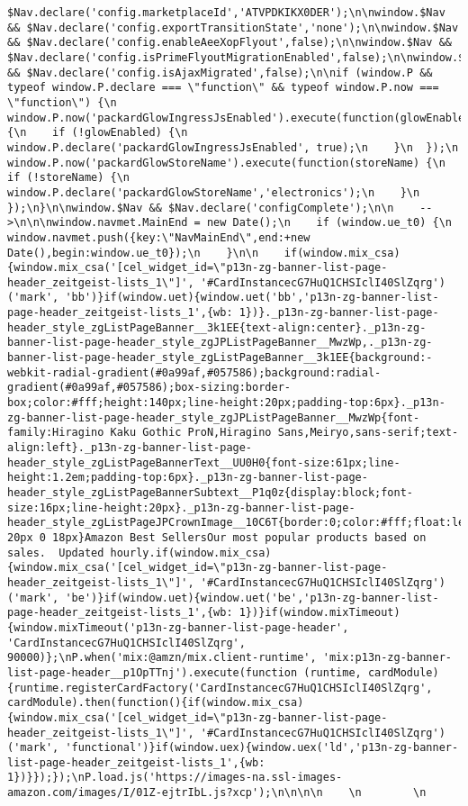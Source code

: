 \documentclass[
]{article}
\begin{document}
\begin{verbatim}
$Nav.declare('config.marketplaceId','ATVPDKIKX0DER');\n\nwindow.$Nav && $Nav.declare('config.exportTransitionState','none');\n\nwindow.$Nav && $Nav.declare('config.enableAeeXopFlyout',false);\n\nwindow.$Nav && $Nav.declare('config.isPrimeFlyoutMigrationEnabled',false);\n\nwindow.$Nav && $Nav.declare('config.isAjaxMigrated',false);\n\nif (window.P && typeof window.P.declare === \"function\" && typeof window.P.now === \"function\") {\n  window.P.now('packardGlowIngressJsEnabled').execute(function(glowEnabled) {\n    if (!glowEnabled) {\n      window.P.declare('packardGlowIngressJsEnabled', true);\n    }\n  });\n  window.P.now('packardGlowStoreName').execute(function(storeName) {\n    if (!storeName) {\n      window.P.declare('packardGlowStoreName','electronics');\n    }\n  });\n}\n\nwindow.$Nav && $Nav.declare('configComplete');\n\n    -->\n\n\nwindow.navmet.MainEnd = new Date();\n    if (window.ue_t0) {\n      window.navmet.push({key:\"NavMainEnd\",end:+new Date(),begin:window.ue_t0});\n    }\n\n    if(window.mix_csa){window.mix_csa('[cel_widget_id=\"p13n-zg-banner-list-page-header_zeitgeist-lists_1\"]', '#CardInstancecG7HuQ1CHSIclI40SlZqrg')('mark', 'bb')}if(window.uet){window.uet('bb','p13n-zg-banner-list-page-header_zeitgeist-lists_1',{wb: 1})}._p13n-zg-banner-list-page-header_style_zgListPageBanner__3k1EE{text-align:center}._p13n-zg-banner-list-page-header_style_zgJPListPageBanner__MwzWp,._p13n-zg-banner-list-page-header_style_zgListPageBanner__3k1EE{background:-webkit-radial-gradient(#0a99af,#057586);background:radial-gradient(#0a99af,#057586);box-sizing:border-box;color:#fff;height:140px;line-height:20px;padding-top:6px}._p13n-zg-banner-list-page-header_style_zgJPListPageBanner__MwzWp{font-family:Hiragino Kaku Gothic ProN,Hiragino Sans,Meiryo,sans-serif;text-align:left}._p13n-zg-banner-list-page-header_style_zgListPageBannerText__UU0H0{font-size:61px;line-height:1.2em;padding-top:6px}._p13n-zg-banner-list-page-header_style_zgListPageBannerSubtext__P1q0z{display:block;font-size:16px;line-height:20px}._p13n-zg-banner-list-page-header_style_zgListPageJPCrownImage__10C6T{border:0;color:#fff;float:left;height:80px;margin:20px 20px 0 18px}Amazon Best SellersOur most popular products based on sales.  Updated hourly.if(window.mix_csa){window.mix_csa('[cel_widget_id=\"p13n-zg-banner-list-page-header_zeitgeist-lists_1\"]', '#CardInstancecG7HuQ1CHSIclI40SlZqrg')('mark', 'be')}if(window.uet){window.uet('be','p13n-zg-banner-list-page-header_zeitgeist-lists_1',{wb: 1})}if(window.mixTimeout){window.mixTimeout('p13n-zg-banner-list-page-header', 'CardInstancecG7HuQ1CHSIclI40SlZqrg', 90000)};\nP.when('mix:@amzn/mix.client-runtime', 'mix:p13n-zg-banner-list-page-header__p1OpTTnj').execute(function (runtime, cardModule) {runtime.registerCardFactory('CardInstancecG7HuQ1CHSIclI40SlZqrg', cardModule).then(function(){if(window.mix_csa){window.mix_csa('[cel_widget_id=\"p13n-zg-banner-list-page-header_zeitgeist-lists_1\"]', '#CardInstancecG7HuQ1CHSIclI40SlZqrg')('mark', 'functional')}if(window.uex){window.uex('ld','p13n-zg-banner-list-page-header_zeitgeist-lists_1',{wb: 1})}});});\nP.load.js('https://images-na.ssl-images-amazon.com/images/I/01Z-ejtrIbL.js?xcp');\n\n\n\n    \n        \n            
\end{verbatim}
\end{document}
